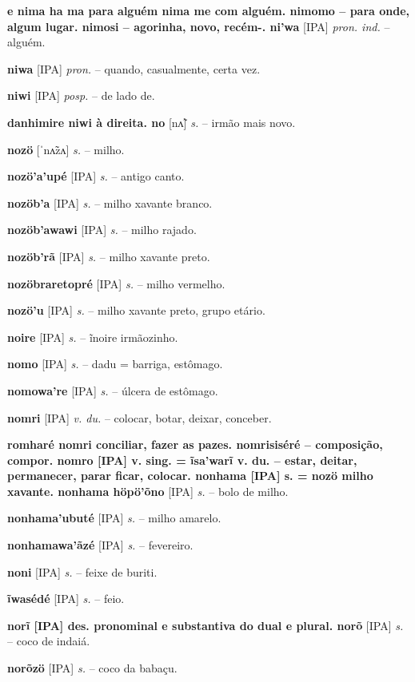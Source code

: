 \textbf{e nima ha ma para alguém  nima me com alguém. nimomo -- para onde, algum lugar. nimosi -- agorinha, novo, recém-. ni'wa} [IPA] \textit{pron. ind.} -- alguém.

\textbf{niwa} [IPA] \textit{pron.} -- quando, casualmente, certa vez.

\textbf{niwi} [IPA] \textit{posp.} -- de lado de.

\textbf{danhimire niwi à direita. no} [nʌ̃] \textit{s.} -- irmão mais novo.

\textbf{nozö} [ˈnʌ̃zʌ] \textit{s.} -- milho.

\textbf{nozö'a'upé} [IPA] \textit{s.} -- antigo canto.

\textbf{nozöb'a} [IPA] \textit{s.} -- milho xavante branco.

\textbf{nozöb'awawi} [IPA] \textit{s.} -- milho rajado.

\textbf{nozöb'rã} [IPA] \textit{s.} -- milho xavante preto.

\textbf{nozöbraretopré} [IPA] \textit{s.} -- milho vermelho.

\textbf{nozö'u} [IPA] \textit{s.} -- milho xavante preto, grupo etário.

\textbf{noire} [IPA] \textit{s.} -- ĩnoire irmãozinho.

\textbf{nomo} [IPA] \textit{s.} -- dadu = barriga, estômago.

\textbf{nomowa're} [IPA] \textit{s.} -- úlcera de estômago.

\textbf{nomri} [IPA] \textit{v. du.} -- colocar, botar, deixar, conceber.

\textbf{romharé nomri conciliar, fazer as pazes. nomrisiséré -- composição, compor. nomro [IPA] v. sing. = ĩsa'warĩ v. du. -- estar, deitar, permanecer, parar ficar, colocar. nonhama [IPA] s. = nozö milho xavante. nonhama höpö'õno} [IPA] \textit{s.} -- bolo de milho.

\textbf{nonhama'ubuté} [IPA] \textit{s.} -- milho amarelo.

\textbf{nonhamawa'ãzé} [IPA] \textit{s.} -- fevereiro.

\textbf{noni} [IPA] \textit{s.} -- feixe de buriti.

\textbf{ĩwasédé} [IPA] \textit{s.} -- feio. \href{https://xavante.pythonanywhere.com/static/dicionario/play.html?file=ugly.wav}{\faHeadphones}

\textbf{norĩ [IPA] des. pronominal e substantiva do dual e plural. norõ} [IPA] \textit{s.} -- coco de indaiá.

\textbf{norõzö} [IPA] \textit{s.} -- coco da babaçu.

